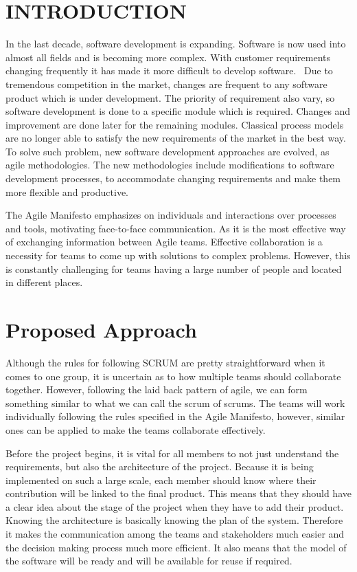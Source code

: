 \documentclass[sigconf]{acmart}
\begin{document}
\section{INTRODUCTION}
In the last decade, software development is expanding. Software is now used into almost all fields and is becoming more complex. With customer requirements changing frequently it has made it more difficult to develop software.  Due to tremendous competition in the market, changes are frequent to any software product which is under development. The priority of requirement also vary, so software development is done to a specific module which is required. Changes and improvement are done later for the remaining modules. Classical process models are no longer able to satisfy the new requirements of the market in the best way. To solve such problem, new software development approaches are evolved, as agile methodologies. The new methodologies include modifications to software development processes, to accommodate changing requirements and make them more flexible and productive. 

The Agile Manifesto emphasizes on individuals and interactions over processes and tools, motivating face-to-face communication. As it is the most effective way of exchanging information between Agile teams. Effective collaboration is a necessity for teams to come up with solutions to complex problems. However, this is constantly challenging for teams having a large number of people and located in different places. 

\section{Proposed Approach}
Although the rules for following SCRUM are pretty straightforward when it comes to one group, it is uncertain as to how multiple teams should collaborate together. 
However, following the laid back pattern of agile, we can form something similar to what we can call the scrum of scrums. The teams will work individually following the rules specified in the Agile Manifesto, however, similar ones can be applied to make the teams collaborate effectively. 

Before the project begins, it is vital for all members to not just understand the requirements, but also the architecture of the project. Because it is being implemented on such a large scale, each member should know where their contribution will be linked to the final product. This means that they should have a clear idea about the stage of the project when they have to add their product. Knowing the architecture is basically knowing the plan of the system. Therefore it makes the communication among the teams and stakeholders much easier and the decision making process much more efficient. It also means that the model of the software will be ready and will be available for reuse if required. 
\end{document}
